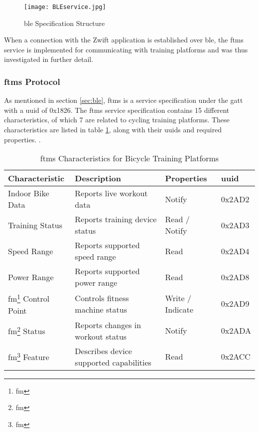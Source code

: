 \begin{figure}[H]
	\begin{center}
		\texttt{[image: BLEservice.jpg]}
		\caption{\ac{ble} Specification Structure}
		\label{fig:serv}
		\citep[Adapted from ][chap.~4]{Townsend:2014}
	\end{center}
\end{figure}

When a connection with the Zwift application is established over \ac{ble}, the \ac{ftms} service is implemented for communicating with training platforms and was thus investigated in further detail.

\subsubsection{\acf{ftms} Protocol}\label{sec:ftms}

As mentioned in section \ref{sec:ble}, \acf{ftms} is a service specification under the \acf{gatt} with a \ac{uuid} of 0x1826. The \ac{ftms} service specification contains 15 different characteristics, of which 7 are related to cycling training platforms. These characteristics are listed in table \ref{tab:ftmsft}, along with their \acp{uuid} and required properties. \cite[section ~4.9]{BLSIG:2017}.


\begin{table}[H]
	\renewcommand{\arraystretch}{\tablestretch}
	\centering
	\caption{\ac{ftms} Characteristics for Bicycle Training Platforms}
	\citep{Huawei:2022}
	\begin{tabularx}{\textwidth}{>{\raggedright}p{3cm} >{\raggedright}X >{\raggedright}p{2.3cm} p{1.3cm}}
		\toprule
		Characteristic                               & Description                             & Properties       & \acs{uuid} \\
		\midrule
		Indoor Bike Data                             & Reports live workout data               & Notify           & 0x2AD2     \\
		Training Status                              & Reports training device status          & Read / Notify    & 0x2AD3     \\
		Speed Range                                  & Reports supported speed range           & Read             & 0x2AD4     \\
		Power Range                                  & Reports supported power range           & Read             & 0x2AD8     \\
		\acs{fm}\footnote[1]{\acf{fm}} Control Point & Controls fitness machine status         & Write / Indicate & 0x2AD9     \\
		\acs{fm}\footnote[1]{\acf{fm}} Status        & Reports changes in workout status       & Notify           & 0x2ADA     \\
		\acs{fm}\footnote[1]{\acf{fm}} Feature       & Describes device supported capabilities & Read             & 0x2ACC     \\
		\bottomrule
	\end{tabularx}
	\label{tab:ftmsft}
\end{table}

